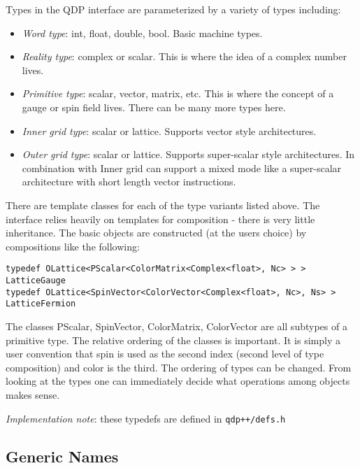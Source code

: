 \documentclass[12pt,letterpaper]{article}
\begin{document}
Types in the QDP interface are parameterized by a variety of types including:
\begin{itemize}
\item {\em Word type}: 
  int, float, double, bool. Basic machine types.
\item {\em Reality type}: 
  complex or scalar. This is where the idea of a complex number
  lives.
\item {\em Primitive type}: 
  scalar, vector, matrix, etc. This is where the concept of a gauge or
  spin field lives. There can be many more types here.
\item {\em Inner grid type}: 
  scalar or lattice. Supports vector style architectures.
\item {\em Outer grid type}:
  scalar or lattice. Supports super-scalar style architectures. In
  combination with Inner grid can support a mixed mode like a
  super-scalar architecture with short length vector instructions.
\end{itemize}

There are template classes for each of the type variants listed
above. The interface relies heavily on templates for
composition - there is very little inheritance. The basic objects are
constructed (at the users choice) by compositions like the following:

\begin{verbatim}
typedef OLattice<PScalar<ColorMatrix<Complex<float>, Nc> > > LatticeGauge
typedef OLattice<SpinVector<ColorVector<Complex<float>, Nc>, Ns> > LatticeFermion
\end{verbatim}
%
The classes PScalar, SpinVector, ColorMatrix,
ColorVector are all subtypes of a primitive type. The relative
ordering of the classes is important. It is simply a user convention
that spin is used as the second index (second level of type
composition) and color is the third. The ordering of types can be
changed. From looking at the types one can immediately decide what
operations among objects makes sense.

{\em Implementation note}: these typedefs are defined in  {\tt qdp++/defs.h}


\subsection{Generic Names}
\end{document}
